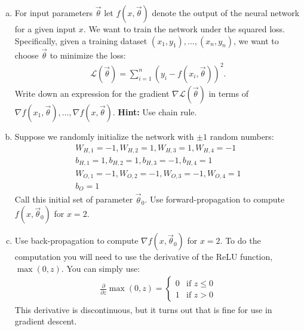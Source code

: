 \documentclass[10pt]{article}
\begin{document}
\begin{enumerate}[(a)]
	\item For input parameters $\vec{\theta}$ let $f(x,\vec{\theta})$ denote the output of the neural network for a given input $x$. We want to train the network under the squared loss. Specifically, given a training dataset $(x_1,y_1),\ldots, (x_n,y_n)$, we want to choose $\vec{\theta}$ to minimize the loss:
	\begin{align*}
	\mathcal{L}(\vec{\theta}) = \sum_{i=1}^n (y_i - f(x_i,\vec{\theta}))^2.
	\end{align*}
	Write down an expression for the gradient $\nabla \mathcal{L}(\vec{\theta})$ in terms of $\nabla f(x_1,\vec{\theta}), \ldots, \nabla f(x,\vec{\theta})$. \textbf{Hint:} Use chain rule.

	\item Suppose we randomly initialize the network with $\pm 1$ random numbers:
	\begin{align*}
	W_{H,1} = -1, W_{H,2} = 1 , W_{H,3} = 1, W_{H,4} = -1\\
	b_{H,1} = 1, b_{H,2} = 1,b_{H,3} = -1,b_{H,4} = 1 \\
	W_{O,1} = -1, W_{O,2} = -1 , W_{O,3} = -1, W_{O,4} = 1\\
	b_O = 1
	\end{align*}
	Call this initial set of parameter $\vec{\theta}_0$. Use forward-propagation to compute $ f(x,\vec{\theta}_0)$ for $x = 2$. 
	
	\item Use back-propagation to compute $\nabla f(x,\vec{\theta}_0)$ for $x = 2$. To do the computation you will need to use the derivative of the ReLU function, $\max(0,z)$. You can simply use:
	\begin{align*}
	\frac{\partial}{\partial z} \max(0,z) = \begin{cases}
	0 &\text{if } z \leq 0\\
	1 &\text{if } z > 0
	\end{cases}
	\end{align*}
	This derivative is discontinuous, but it turns out that is fine for use in gradient descent.
\end{enumerate}
\end{document}
